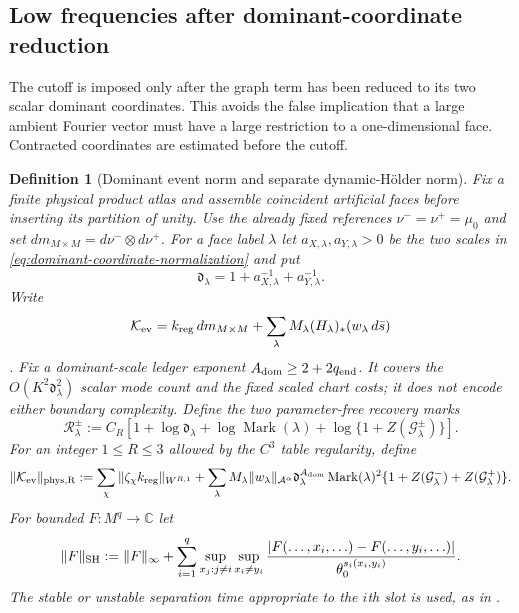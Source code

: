 \documentclass[11pt]{article}
\newtheorem{definition}[theorem]{Definition}
\begin{document}
\subsection{Low frequencies after dominant-coordinate reduction}

The cutoff is imposed only after the graph term has been reduced to its two
scalar dominant coordinates.  This avoids the false implication that a large
ambient Fourier vector must have a large restriction to a one-dimensional
face.  Contracted coordinates are estimated before the cutoff.

\begin{definition}[Dominant event norm and separate dynamic-H\"older norm]
\label{def:event-current-norm}
Fix a finite physical product atlas and assemble coincident artificial faces
before inserting its partition of unity.  Use the already fixed references
$\nu^-=\nu^+=\mu_0$ and set
$dm_{M\times M}=d\nu^-\otimes d\nu^+$.  For a face label $\lambda$ let
$a_{X,\lambda},a_{Y,\lambda}>0$ be the two scales in
\eqref{eq:dominant-coordinate-normalization} and put
\[
 \mathfrak d_\lambda=1+a_{X,\lambda}^{-1}+a_{Y,\lambda}^{-1}.
\]
Write
\[
 \mathcal K_{\rm ev}=k_{\rm reg}\,dm_{M\times M}
 +\sum_\lambda M_\lambda(H_\lambda)_*(w_\lambda\,d\bar s)
\].
Fix a dominant-scale ledger exponent
$A_{\rm dom}\ge2+2q_{\rm end}$.  It covers the
$O(K^2\mathfrak d_\lambda^2)$ scalar mode count and the fixed scaled chart
costs; it does not encode either boundary complexity.  Define the two
parameter-free recovery marks
\begin{equation}
\label{eq:section-recovery-mark}
 \mathcal R_\lambda^\pm:=C_R\left[1+\log\mathfrak d_\lambda
 +\log\operatorname{Mark}(\lambda)
 +\log\{1+Z(\mathcal G_\lambda^\pm)\}\right].
\end{equation}
For an integer $1\le R\le3$ allowed by the $C^3$ table regularity, define
\begin{equation}
\label{eq:event-physical-norm}
 \|\mathcal K_{\rm ev}\|_{\rm phys,R}:=
 \sum_\chi\|\zeta_\chi k_{\rm reg}\|_{W^{R,1}}
 +\sum_\lambda M_\lambda\|w_\lambda\|_{\mathcal A^\alpha}
 \mathfrak d_\lambda^{A_{\rm dom}}\operatorname{Mark}(\lambda)^2
 \{1+Z(\mathcal G_\lambda^-)+Z(\mathcal G_\lambda^+)\}.
\end{equation}
For bounded $F:M^q\to\mathbb C$ let
\begin{equation}
\label{eq:separate-dynamic-holder-norm}
 \|F\|_{\rm SH}:=\|F\|_\infty+
 \sum_{i=1}^q\sup_{x_j:j\ne i}\sup_{x_i\ne y_i}
 \frac{|F(\ldots,x_i,\ldots)-F(\ldots,y_i,\ldots)|}
      {\theta_0^{s_i(x_i,y_i)}}.
\end{equation}
The stable or unstable separation time appropriate to the $i$th slot is used,
as in \cite[Definition~2.2]{LS}.
\end{definition}
\end{document}
